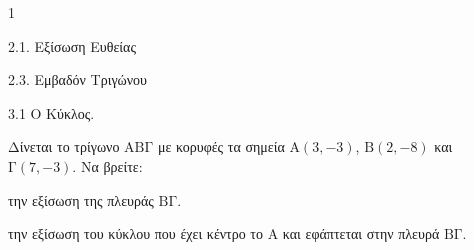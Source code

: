 \begin{ylh}{1}
    \item 2.1. Εξίσωση Ευθείας
    \item 2.3. Εμβαδόν Τριγώνου
    \item 3.1 Ο Κύκλος.
\end{ylh}
Δίνεται το τρίγωνο $\mathrm{AB\Gamma}$ με κορυφές τα σημεία $\mathrm{A}(3,-3)$, $\mathrm{B}(2,-8)$ και $\mathrm{\Gamma}(7,-3)$. Να βρείτε:
\begin{alist}
\item την εξίσωση της πλευράς $\mathrm{B\Gamma}$. 
\item την εξίσωση του κύκλου που έχει κέντρο το $\mathrm{A}$ και εφάπτεται στην πλευρά $\mathrm{B\Gamma}$. 
\end{alist}
